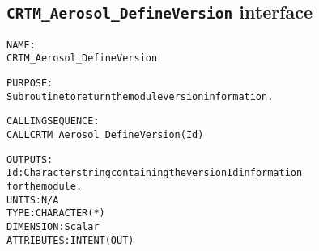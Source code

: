 \subsection{\texttt{CRTM\_Aerosol\_DefineVersion} interface}
  \label{sec:CRTM_Aerosol_DefineVersion_interface}
  \begin{alltt}
 
  NAME:
        CRTM_Aerosol_DefineVersion
 
  PURPOSE:
        Subroutine to return the module version information.
 
  CALLING SEQUENCE:
        CALL CRTM_Aerosol_DefineVersion( Id )
 
  OUTPUTS:
        Id:   Character string containing the version Id information
              for the module.
              UNITS:      N/A
              TYPE:       CHARACTER(*)
              DIMENSION:  Scalar
              ATTRIBUTES: INTENT(OUT)
 
  \end{alltt}
